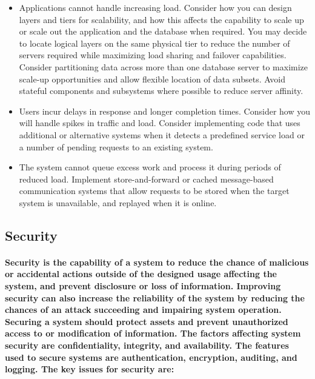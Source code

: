\documentclass[../Psychological_system_web_application.tex]{subfiles}
\begin{document}
				\begin{itemize}
					\item
						Applications cannot handle increasing load. Consider how you can design layers and tiers for scalability, and how this affects the capability to scale up or scale out the application and the database when required. You may decide to locate logical layers on the same physical tier to reduce the number of servers required while maximizing load sharing and failover capabilities. Consider partitioning data across more than one database server to maximize scale-up opportunities and allow flexible location of data subsets. Avoid stateful components and subsystems where possible to reduce server affinity.
					\item
						Users incur delays in response and longer completion times. Consider how you will handle spikes in traffic and load. Consider implementing code that uses additional or alternative systems when it detects a predefined service load or a number of pending requests to an existing system.
					\item
						The system cannot queue excess work and process it during periods of reduced load. Implement store-and-forward or cached message-based communication systems that allow requests to be stored when the target system is unavailable, and replayed when it is online.
					
				\end{itemize}
				
			
			\subsection{Security}
				
				\paragraph{\gls{Security} is the capability of a system to reduce the chance of malicious or accidental actions outside of the designed usage affecting the system, and prevent disclosure or loss of information. Improving security can also increase the reliability of the system by reducing the chances of an attack succeeding and impairing system operation. Securing a system should protect assets and prevent unauthorized access to or modification of information. The factors affecting system security are confidentiality, integrity, and availability. The features used to secure systems are authentication, encryption, auditing, and logging. The key issues for security are:}
				
\end{document}
